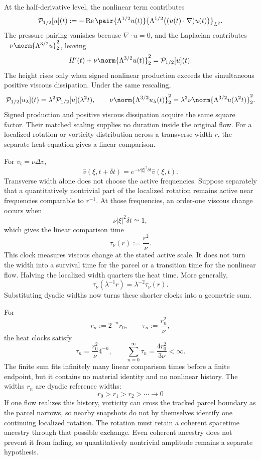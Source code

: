 
At the half-derivative level, the nonlinear term contributes
\[
  \mathcal P_{1/2}[u](t)
  :=
  -\operatorname{Re}
  \pair
    {\Lambda^{1/2}u(t)}
    {\Lambda^{1/2}\bigl((u(t)\cdot\nabla)u(t)\bigr)}_{L^2}.
\]
The pressure pairing vanishes because \(\nabla\cdot u=0\), and the Laplacian contributes \(-\nu\norm{\Lambda^{3/2}u}_2^2\), leaving
\[
  H'(t)
  +
  \nu\norm{\Lambda^{3/2}u(t)}_2^2
  =
  \mathcal P_{1/2}[u](t).
\]
The height rises only when signed nonlinear production exceeds the simultaneous positive viscous dissipation. Under the same rescaling,
\[
  \mathcal P_{1/2}[u_\lambda](t)
  =
  \lambda^2\mathcal P_{1/2}[u](\lambda^2t),
  \qquad
  \nu\norm{\Lambda^{3/2}u_\lambda(t)}_2^2
  =
  \lambda^2\nu\norm{\Lambda^{3/2}u(\lambda^2t)}_2^2.
\]
Signed production and positive viscous dissipation acquire the same square factor. Their matched scaling supplies no duration inside the original flow. For a localized rotation or vorticity distribution across a transverse width \(r\), the separate heat equation gives a linear comparison.


For \(v_t=\nu\Delta v\),
\[
  \widehat v(\xi,t+\delta t)
  =
  e^{-\nu|\xi|^2\delta t}\widehat v(\xi,t).
\]
Transverse width alone does not choose the active frequencies. Suppose separately that a quantitatively nontrivial part of the localized rotation remains active near frequencies comparable to \(r^{-1}\). At those frequencies, an order-one viscous change occurs when
\[
  \nu|\xi|^2\delta t\simeq1,
\]
which gives the linear comparison time
\[
  \tau_\nu(r)
  :=
  \frac{r^2}{\nu}.
\]
This clock measures viscous change at the stated active scale. It does not turn the width into a survival time for the parcel or a transition time for the nonlinear flow. Halving the localized width quarters the heat time. More generally,
\[
  \tau_\nu(\lambda^{-1}r)
  =
  \lambda^{-2}\tau_\nu(r).
\]
Substituting dyadic widths now turns these shorter clocks into a geometric sum.


For
\[
  r_n:=2^{-n}r_0,
  \qquad
  \tau_n:=\frac{r_n^2}{\nu},
\]
the heat clocks satisfy
\[
  \tau_n
  =
  \frac{r_0^2}{\nu}4^{-n},
  \qquad
  \sum_{n=0}^{\infty}\tau_n
  =
  \frac{4r_0^2}{3\nu}
  <
  \infty.
\]
The finite sum fits infinitely many linear comparison times before a finite endpoint, but it contains no material identity and no nonlinear history. The widths \(r_n\) are dyadic reference widths:
\[
  r_0>r_1>r_2>\cdots\longrightarrow0
\]
If one \NavierStokes{} flow realizes this history, vorticity can cross the tracked parcel boundary as the parcel narrows, so nearby snapshots do not by themselves identify one continuing localized rotation. The rotation must retain a coherent spacetime ancestry through that possible exchange. Even coherent ancestry does not prevent it from fading, so quantitatively nontrivial amplitude remains a separate hypothesis.

